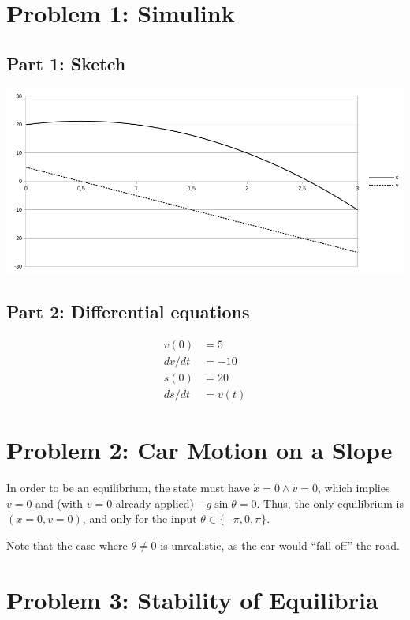 \documentclass[a4paper,parskip,headheight=38pt]{scrartcl} %
\begin{document}
\section*{Problem 1: Simulink}

\subsection*{Part 1: Sketch}

\includegraphics[width=\textwidth]{p1-sketch}

\subsection*{Part 2: Differential equations}

\begin{align*}
    v(0) &= 5 \\
    dv/dt &= -10 \\
    s(0) &= 20 \\
    ds/dt &= v(t)
\end{align*}


\section*{Problem 2: Car Motion on a Slope}

In order to be an equilibrium, the state must have $\dot{x} = 0 \land
\dot{v} = 0$, which implies $v=0$ and (with $v=0$ already applied) $-g
\sin \theta = 0$.  Thus, the only equilibrium is $(x=0, v=0)$, and only
for the input $\theta \in \{-\pi, 0, \pi\}$.

Note that the case where $\theta \neq 0$ is unrealistic, as the car
would \enquote{fall off} the road.


\section*{Problem 3: Stability of Equilibria}
\end{document}
